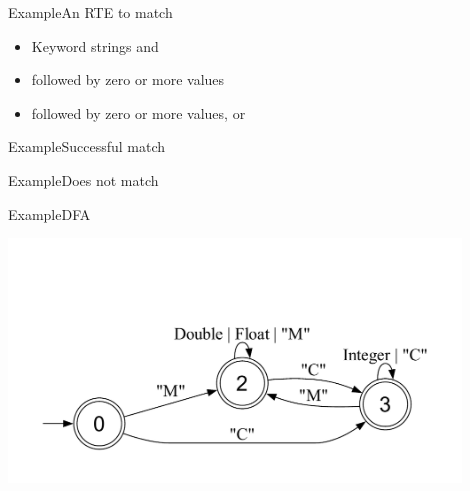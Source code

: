 \newsavebox\exampleAbbox
\begin{lrbox}{\exampleAbbox}
  \begin{minipage}{12cm}
    
  \end{minipage}
\end{lrbox}

\newsavebox\exampleAcbox
\begin{lrbox}{\exampleAcbox}
  \begin{minipage}{12cm}
    
  \end{minipage}
\end{lrbox}

\newsavebox\exampleAdbox
\begin{lrbox}{\exampleAdbox}
  \begin{minipage}{12cm}
    
  \end{minipage}
\end{lrbox}


\begin{frame}{Example}{An RTE to match}
  \usebox\exampleAbox

  \begin{itemize}
  \item Keyword strings  and 
  \item {} followed by zero or more  values
  \item {} followed by zero or more values,  or 
  \end{itemize}
\end{frame}

\begin{frame}{Example}{Successful match}
  \usebox\exampleAbbox
\end{frame}

\begin{frame}{Example}{Does not match}
  \usebox\exampleAcbox
\end{frame}

\begin{frame}{Example}{DFA}
  \usebox\exampleAdbox
  
  \includegraphics[width=0.9\textwidth]{example2.pdf}
\end{frame}

